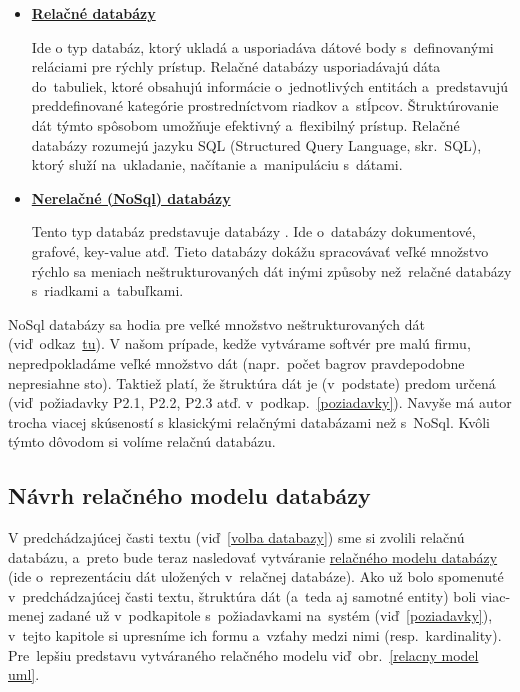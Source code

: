 \begin{itemize}
\item \textbf{\href{https://azure.microsoft.com/cs-cz/resources/cloud-computing-dictionary/what-is-a-relational-database/\#whatis}{Relačné databázy}}

Ide o typ databáz, ktorý ukladá a usporiadáva dátové body s~definovanými reláciami pre rýchly prístup. Relačné databázy usporiadávajú dáta do~tabuliek, ktoré obsahujú informácie o~jednotlivých entitách a~predstavujú preddefinované kategórie prostredníctvom riadkov a~stĺpcov. Štruktúrovanie dát týmto spôsobom umožňuje efektivný a~flexibilný prístup. Relačné databázy rozumejú jazyku SQL (Structured Query Language, skr.~SQL), ktorý služí na~ukladanie, načítanie a~manipuláciu s~dátami.

\item \textbf{\href{https://azure.microsoft.com/cs-cz/resources/cloud-computing-dictionary/what-is-nosql-database/}{Nerelačné (NoSql) databázy}}

Tento typ databáz predstavuje databázy . Ide o~databázy dokumentové, grafové, key-value atď. Tieto databázy dokážu spracovávať veľké množstvo rýchlo sa meniach neštrukturovaných dát inými způsoby než~relačné databázy s~riadkami a~tabuľkami.
\end{itemize}

NoSql databázy sa hodia pre veľké množstvo neštrukturovaných dát (viď~odkaz~\href{https://www.coursera.org/articles/relational-vs-non-relational-database#2-when-to-use-a-relational-vs-a-non-relational-database}{tu}). V našom prípade, kedže vytvárame softvér pre malú firmu, nepredpokladáme veľké množstvo dát (napr.~počet bagrov pravdepodobne nepresiahne sto). Taktiež platí, že štruktúra dát je (v~podstate) predom určená (viď~požiadavky P2.1, P2.2, P2.3 atď. v~podkap.~\ref{poziadavky}). Navyše má  autor trocha viacej skúseností s klasickými relačnými databázami než s~NoSql. Kvôli týmto dôvodom si volíme relačnú databázu.

\subsection{Návrh relačného modelu databázy}
\label{navrh relacneho modelu databazy}

V predchádzajúcej časti textu (viď~\ref{volba databazy}) sme si zvolili relačnú databázu, a~preto bude teraz nasledovať vytváranie \href{https://www.geeksforgeeks.org/relational-model-in-dbms/}{relačného modelu databázy} (ide o~reprezentáciu dát uložených v~relačnej databáze). Ako už bolo spomenuté v~predchádzajúcej časti textu, štruktúra dát (a~teda aj samotné entity) boli viac-menej zadané už v~podkapitole s~požiadavkami na~systém (viď~\ref{poziadavky}), v~tejto kapitole si upresníme ich formu a~vzťahy medzi nimi (resp.~kardinality). Pre~lepšiu predstavu vytváraného relačného modelu viď~obr.~\ref{relacny model uml}.

